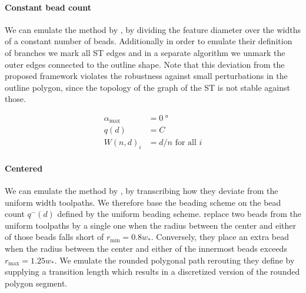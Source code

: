 \paragraph{Constant bead count}
We can emulate the method by \citeauthor{Ding2016a}, by dividing the feature diameter over the widths of a constant number of beads.
Additionally in order to emulate their definition of branches we mark all ST edges and in a separate algorithm we unmark the outer edges connected to the outline shape.
Note that this deviation from the proposed framework violates the robustness against small perturbations in the outline polygon, since the topology of the graph of the ST is not stable against those.

\begin{align*}
\alpha_\text{max} &= \SI{0}{\degree} \\
q(d) &= C \\
W(n,d)_i &= d / n \text{ for all } i 
\end{align*}



\paragraph{Centered}
We can emulate the method by \citeauthor{Jin2017JMS}, by transcribing how they deviate from the uniform width toolpaths.
We therefore base the beading scheme on the bead count $q^-(d)$ defined by the uniform beading scheme.
\citeauthor{Jin2017JMS} replace two beads from the uniform toolpaths by a single one when the radius between the center and either of those beads falls short of $r_\text{min} = 0.8 w_*$.
Conversely, they place an extra bead when the radius between the center and either of the innermost beads exceeds $r_\text{max} = 1.25 w_*$.\cite{Jin2017JMS}
We emulate the rounded polygonal path rerouting they define by supplying a transition length which results in a discretized version of the rounded polygon segment.

